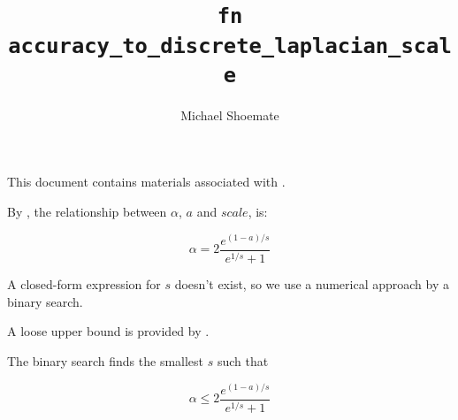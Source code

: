\documentclass{article}
\title{\texttt{fn accuracy\_to\_discrete\_laplacian\_scale}}
\author{Michael Shoemate}
\begin{document}
\maketitle

This document contains materials associated with .

By ,
the relationship between $\alpha$, $a$ and $scale$, is:

\begin{equation*}
    \alpha = 2 \frac{e^{(1 - a)/s}}{e^{1/s} + 1}
\end{equation*}

A closed-form expression for $s$ doesn't exist,
so we use a numerical approach by a binary search.

A loose upper bound is provided by .

The binary search finds the smallest $s$ such that

\begin{equation*}
    \alpha \le 2 \frac{e^{(1 - a)/s}}{e^{1/s} + 1}
\end{equation*}
\end{document}
